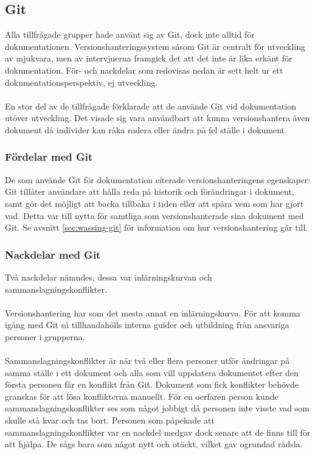 \subsection{Git}
\label{sec:wassing-gitresults}
Alla tillfrågade grupper hade använt sig av Git, dock inte alltid för dokumentationen. Versionshanteringssystem såsom Git är centralt för utveckling av mjukvara, men av intervjuerna framgick det att det inte är lika erkänt för dokumentation. För- och nackdelar som redovisas nedan är sett helt ur ett dokumentationsperspektiv, ej utveckling.
\\ \\
En stor del av de tillfrågade förklarade att de använde Git vid dokumentation utöver utveckling. Det visade sig vara användbart att kunna versionshantera även dokument då individer kan råka radera eller ändra på fel ställe i dokument.

\subsubsection{Fördelar med Git}
De som använde Git för dokumentation citerade versionshanteringens egenskaper: Git tillåter användare att hålla reda på historik och förändringar i dokument, samt gör det möjligt att backa tillbaka i tiden eller att spåra vem som har gjort vad. Detta var till nytta för samtliga som versionshanterade sina dokument med Git. Se avsnitt \ref{sec:wassing-git} för information om hur versionshantering går till.

\subsubsection{Nackdelar med Git}
Två nackdelar nämndes, dessa var inlärningskurvan och sammanslagningskonflikter.
\\ \\
Versionshantering har som det mesta annat en inlärningskurva. För att komma igång med Git så tillhandahölls interna guider och utbildning från ansvariga personer i grupperna.
\\ \\
Sammanslagningskonflikter är när två eller flera personer utför ändringar på samma ställe i ett dokument och alla som vill uppdatera dokumentet efter den första personen får en konflikt från Git. 
Dokument som fick konflikter behövde granskas för att lösa konflikterna manuellt. För en oerfaren person kunde sammanslagningskonflikter ses som något jobbigt då personen inte visste vad som skulle stå kvar och tas bort. Personen som påpekade att sammanslagningskonflikter var en nackdel medgav dock senare att de finns till för att hjälpa. De sågs bara som något nytt och otäckt, vilket gav ogrundad rädsla.

